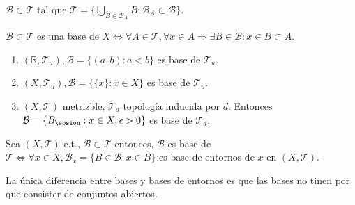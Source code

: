 \begin{obs}
  $\mathcal{B} \subset \mathcal{T}$ tal que $\mathcal{T} = \{ \bigcup_{B \in \mathcal{B}_{A}} B: \mathcal{B}_{A} \subset \mathcal{B} \}$.
\end{obs}

\begin{obs}
  $\mathcal{B} \subset \mathcal{T}$ es una base de $X \Leftrightarrow \forall A \in \mathcal{T}, \forall x \in A \Rightarrow \exists B  \in \mathcal{B} : x \in B \subset A$.
\end{obs}

\begin{ejm}
  \begin{enumerate}[label=(\roman*)]
    \item $( \mathbb{R} , \mathcal{T}_{u} ), \mathcal{B} = \{ ( a, b ) : a < b \}$ es base de $\mathcal{T}_{u}$.
    \item $( X, \mathcal{T}_{u} ), \mathcal{B} = \{ \{ x \} : x \in X \}$ es base de $\mathcal{T}_{u}$.
    \item $( X, \mathcal{T} )$ metrizble, $\mathcal{T}_{d}$ topología inducida por $d$. Entonces $\mathcal{B} = \{ B_{\epsion} : x \in X, \epsilon > 0 \}$ es base de $\mathcal{T}_{d}$.
  \end{enumerate}
\end{ejm}

\begin{prop}
  Sea $( X, \mathcal{T} )$ e.t., $\mathcal{B} \subset \mathcal{T}$ entonces, $\mathcal{B}$ es base de $\mathcal{T} \Leftrightarrow \forall x \in X, \mathcal{B}_{x} = \{ B \in \mathcal{B}: x \in B \}$ es base de entornos de $x$ en $( X, \mathcal{T} )$.
\end{prop}

\begin{obs}
  La única diferencia entre bases y bases de entornos es que las bases no tinen por que consister de conjuntos abiertos.
\end{obs}

